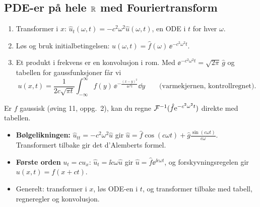 \subsection{PDE-er på hele \texorpdfstring{$\R$}{R} med Fouriertransform}
\begin{oppskrift}[varmelikningen på $\R$: $u_t=c^2u_{xx}$, $u(x,0)=f(x)$, $u\to0$ når $\abs x\to\infty$]
\begin{enumerate}
  \item Transformer i $x$: $\hat u_t(\omega,t)=-c^2\omega^2\hat u(\omega,t)$, en ODE i $t$ for hver $\omega$.
  \item Løs og bruk initialbetingelsen: $\hat u(\omega,t)=\hat f(\omega)\,\ee^{-c^2\omega^2t}$.
  \item Et produkt i frekvens er en konvolusjon i rom. Med $\ee^{-c^2\omega^2t}=\sqrt{2\pi}\,\hat g$ og tabellen for gaussfunksjoner får vi
  \[
  u(x,t)=\frac1{2c\sqrt{\pi t}}\int_{-\infty}^{\infty}f(y)\,\ee^{-\frac{(x-y)^2}{4c^2t}}\dd y\qquad\text{(varmekjernen, kontrollregnet)}.
  \]
\end{enumerate}
Er $f$ gaussisk (øving 11, oppg.~2), kan du regne $\mathcal{F}^{-1}(\hat f\mathrm{e}^{-c^2\omega^2t})$ direkte med tabellen.
\end{oppskrift}
\begin{oppskrift}
\begin{itemize}
  \item \textbf{Bølgelikningen:} $\hat u_{tt}=-c^2\omega^2\hat u$ gir $\hat u=\hat f\cos(c\omega t)+\hat g\frac{\sin(c\omega t)}{c\omega}$. Transformert tilbake gir det d'Alemberts formel.
  \item \textbf{Første orden} $u_t=cu_x$: $\hat u_t=\ii c\omega\hat u$ gir $\hat u=\hat f\ee^{\ii c\omega t}$, og forskyvningsregelen gir $u(x,t)=f(x+ct)$.
  \item Generelt: transformer i $x$, løs ODE-en i $t$, og transformer tilbake med tabell, regneregler og konvolusjon.
\end{itemize}
\end{oppskrift}


